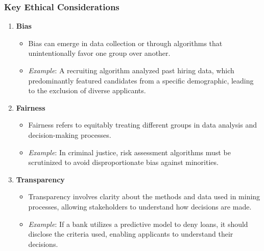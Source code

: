 \documentclass{beamer}
\begin{document}
\begin{frame}[fragile]
    \frametitle{Key Ethical Considerations}
    
    \begin{enumerate}
        \item \textbf{Bias}
            \begin{itemize}
                \item Bias can emerge in data collection or through algorithms that unintentionally favor one group over another.
                \item \textit{Example}: A recruiting algorithm analyzed past hiring data, which predominantly featured candidates from a specific demographic, leading to the exclusion of diverse applicants.
            \end{itemize}
        
        \item \textbf{Fairness}
            \begin{itemize}
                \item Fairness refers to equitably treating different groups in data analysis and decision-making processes.
                \item \textit{Example}: In criminal justice, risk assessment algorithms must be scrutinized to avoid disproportionate bias against minorities.
            \end{itemize}
        
        \item \textbf{Transparency}
            \begin{itemize}
                \item Transparency involves clarity about the methods and data used in mining processes, allowing stakeholders to understand how decisions are made.
                \item \textit{Example}: If a bank utilizes a predictive model to deny loans, it should disclose the criteria used, enabling applicants to understand their decisions.
            \end{itemize}
    \end{enumerate}
\end{frame}
\end{document}
